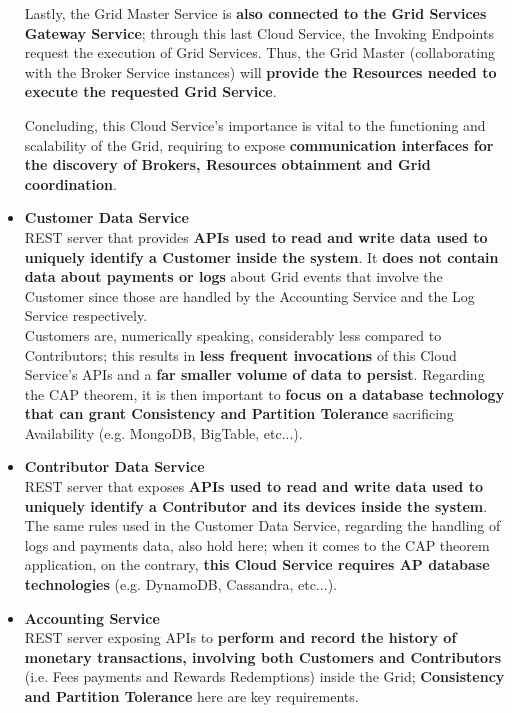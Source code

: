 \begin{itemize}
    Lastly, the Grid Master Service is \textbf{also connected to the Grid Services Gateway Service}; through this last Cloud Service, the Invoking Endpoints request the execution of Grid Services. Thus, the Grid Master (collaborating with the Broker Service instances) will \textbf{provide the Resources needed to execute the requested Grid Service}.

    Concluding, this Cloud Service's importance is vital to the functioning and scalability of the Grid, requiring to expose \textbf{communication interfaces for the discovery of Brokers, Resources obtainment and Grid coordination}.

    \item \textbf{Customer Data Service}\\
    REST server that provides \textbf{APIs used to read and write data used to uniquely identify a Customer inside the system}. It \textbf{does not contain data about payments or logs} about Grid events that involve the Customer since those are handled by the Accounting Service and the Log Service respectively.\\
    Customers are, numerically speaking, considerably less compared to Contributors; this results in \textbf{less frequent invocations} of this Cloud Service's APIs and a \textbf{far smaller volume of data to persist}. Regarding the CAP theorem, it is then important to \textbf{focus on a database technology that can grant Consistency and Partition Tolerance} sacrificing Availability (e.g. MongoDB, BigTable, etc...).

    \item \textbf{Contributor Data Service}\\
    REST server that exposes \textbf{APIs used to read and write data used to uniquely identify a Contributor and its devices inside the system}. The same rules used in the Customer Data Service, regarding the handling of logs and payments data, also hold here; when it comes to the CAP theorem application, on the contrary, \textbf{this Cloud Service requires AP database technologies} (e.g. DynamoDB, Cassandra, etc...).

    \item \textbf{Accounting Service}\\
    REST server exposing APIs to \textbf{perform and record the history of monetary transactions, involving both Customers and Contributors} (i.e. Fees payments and Rewards Redemptions) inside the Grid; \textbf{Consistency and Partition Tolerance} here are key requirements.


\end{itemize}
